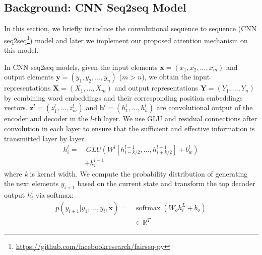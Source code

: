 \subsection{Background: CNN Seq2seq Model}
\label{sec:cnn}
In this section, we briefly introduce the convolutional sequence to sequence (CNN seq2seq\footnote{\url{https://github.com/facebookresearch/fairseq-py}}) model and later we implement our proposed attention mechanism on this model.

%

In CNN seq2seq models, given the input elements $\textbf{x} = (x_{1},x_{2},...,x_{m})$ and 
output elements $\textbf{y} = (y_{1}, y_{2},..., y_{n})$ ($m>n$),
we obtain the input representations  $\mathbf{X} = (X_1,...,X_m)$ 
and output representations $\mathbf{Y}=(Y_1,...,Y_n)$ by combining
word embeddings and their corresponding position embeddings vectors. 
$\mathbf { z } ^ { l } = \left( z _ { 1 } ^ { l } , \ldots , z _ { m } ^ { l } \right)$ and $\mathbf { h } ^ { l } = \left( h _ { 1 } ^ { l } , \ldots , h _ { n } ^ { l } \right)$ 
are convolutional output of the encoder and decoder in the $l$-th layer.
We use GLU \cite{DauphinFAG17} and residual connections \cite{HeZRS16} after convolution 
in each layer to ensure that the sufficient and effective information is transmitted layer by layer.  
\begin{equation}
\begin{split}
h _ { i } ^ { l } = &~ GLU \left( W ^ { l } \left[ h _ {i-k/2 } ^ { l - 1 } , \ldots , h _ { i+k/2 } ^ { l - 1 } \right] + b _ { w } ^ { l } \right) \\
				& + h _ { i } ^ { l - 1 }
\end{split}
\end{equation} 
where \textit{k} is kernel width.
We compute the probability
distribution of generating the next elements $y_{i+1}$
based on the current state and transform the top
decoder output $h_{i}^{l}$ via softmax:
\begin{equation}
\begin{split}
p \left( y _ { i + 1 } | y _ { 1 } , \ldots , y _ { i } , \mathbf { x } \right) = 
& \operatorname { softmax } \left( W _ { o } h _ { i } ^ { L } + b _ { o } \right) \\ 
&\in \mathbb { R } ^ { T }
\end{split}
\end{equation}


